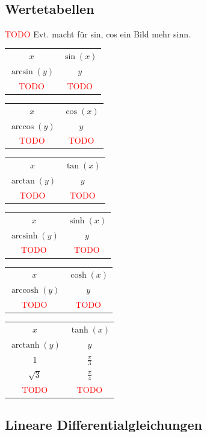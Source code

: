 \documentclass[a4paper,landscape,8pt]{extarticle}
\newcommand{\todo}{\textcolor{red}{TODO }}
\DeclareMathOperator{\arcsinh}{arcsinh}
\DeclareMathOperator{\arccosh}{arccosh}
\DeclareMathOperator{\arctanh}{arctanh}
\renewcommand*{\newpage}{ \ }
\begin{document}
\begin{multicols*}{4}
\newpage


\begin{warmup}
\subsection{Wertetabellen}

\todo Evt. macht für sin, cos ein Bild mehr sinn.

\begin{tabular}{|c|c|}
\toprule
$x$ & $\sin(x)$\\
$\arcsin(y)$ & $y$\\
\hline
\todo & \todo\\
\bottomrule
\end{tabular}

\begin{tabular}{c|c}
$x$ & $\cos(x)$\\
$\arccos(y)$ & $y$\\
\hline
\todo & \todo
\end{tabular}

\begin{tabular}{c|c}
$x$ & $\tan(x)$\\
$\arctan(y)$ & $y$\\
\hline
\todo & \todo
\end{tabular}

\begin{tabular}{c|c}
$x$ & $\sinh(x)$\\
$\arcsinh(y)$ & $y$\\
\hline
\todo & \todo
\end{tabular}

\begin{tabular}{c|c}
$x$ & $\cosh(x)$\\
$\arccosh(y)$ & $y$\\
\hline
\todo & \todo
\end{tabular}

\begin{tabular}{c|c}
$x$ & $\tanh(x)$\\
$\arctanh(y)$ & $y$\\
\hline
$1$ & $\frac{\pi}{3}$\\
$\sqrt{3}$ & $\frac{\pi}{4}$\\
\todo & \todo
\end{tabular}

\begin{warmup}
\section{Lineare Differentialgleichungen}


\end{warmup}
\end{warmup}
\end{multicols*}
\end{document}
